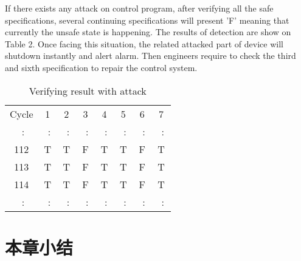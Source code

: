 If there exists any attack on control program, after verifying all the safe specifications, several continuing specifications will present 'F' meaning that currently the unsafe state is happening. The results of detection are show on Table 2. Once facing this situation, the related attacked part of device will shutdown instantly and alert alarm. Then engineers require to check the third and sixth specification to repair the control system.

\begin{table}[!htb]
\centering
\begin{tabular}{cccccccc}

\hline
Cycle & 1 & 2 & 3 & 4 & 5 & 6 & 7\\

~$\colon$ & ~$\colon$ & ~$\colon$ & ~$\colon$ & ~$\colon$ & ~$\colon$ & ~$\colon$ & ~$\colon$\\

112 & T & T & F & T & T & F & T\\

113 & T & T & F & T & T & F & T\\

114 & T & T & F & T & T & F & T\\

~$\colon$ & ~$\colon$ & ~$\colon$ & ~$\colon$ & ~$\colon$ & ~$\colon$ & ~$\colon$ & ~$\colon$\\
\hline
\end{tabular}
\caption{Verifying result with attack}
\end{table} 

\section{本章小结}
\label{sec:insertimage}

